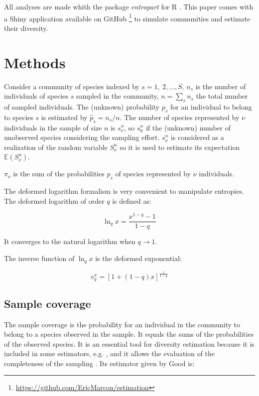 \documentclass[fleqn,10pt]{latex/stylish_article} %
\begin{document}
All analyses are made whith the package \emph{entropart} \citep{Marcon2014c} for R \citep{R}.
This paper comes with a Shiny application available on GitHub \footnote{\url{https://github.com/EricMarcon/estimation}} to simulate communities and estimate their diversity.

\hypertarget{methods}{%
\section{Methods}\label{methods}}

Consider a community of species indexed by \(s=1,\ 2,\dots ,S\). \(n_{s}\) is the number of individuals of species \(s\) sampled in the community, \(n=\sum_s{n_{s}}\) the total number of sampled individuals.
The (unknown) probability \(p_{s}\) for an individual to belong to species \(s\) is estimated by \({\hat{p}}_{s}={n_{s}}/{n}\).
The number of species represented by \(\nu\) individuals in the sample of size \(n\) is \({s}^{n}_{\nu}\), so \({s}^{n}_{0}\) if the (unknown) number of unobserved species considering the sampling effort.
\({s}^{n}_{\nu}\) is considered as a realization of the random variable \({S}^{n}_{\nu}\) so it is used to estimate its expectation \({\mathbb E}({S}^{n}_{\nu})\).

\(\pi_\nu\) is the sum of the probabilities \(p_s\) of species represented by \(\nu\) individuals.

The deformed logarithm formalism \citep{Tsallis1994} is very convenient to manipulate entropies.
The deformed logarithm of order \(q\) is defined as:

\begin{equation}
  \ln_q{x}=\frac{x^{1-q}-1}{1-q}
  \label{eq:lnq}
\end{equation}

It converges to the natural logarithm when \(q\to 1\).

The inverse function of \(\ln_q{x}\) is the deformed exponential:

\begin{equation}
  e^x_q=[1+(1-q)x]^{\frac{1}{1-q}}
  \label{eq:expq}
\end{equation}

\hypertarget{sample-coverage}{%
\subsection{Sample coverage}\label{sample-coverage}}

The sample coverage \citep{Good1953} is the probability for an individual in the community to belong to a species observed in the sample.
It equals the sums of the probabilities of the observed species.
It is an essential tool for diversity estimation because it is included in some estimators, e.g. \citet{Chao2003}, and it allows the evaluation of the completeness of the sampling \citep{Chao2012b}.
Its estimator given by Good is:
\end{document}
